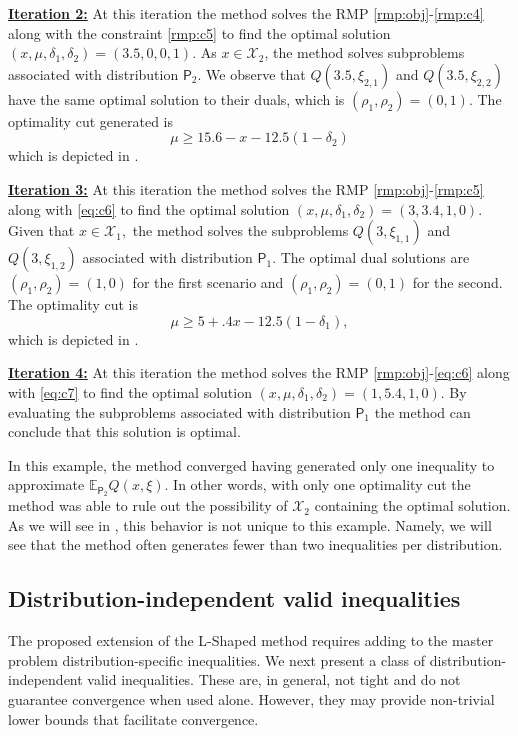 \documentclass[12pt]{article}
\theoremstyle{thmstylethree}%
\newcommand{\mtc}[1] {\mathcal{#1}}
\newcommand{\pr}[1]{\ensuremath{\mathsf{#1}}}
\def\Ex{\ensuremath{\mathbb{E}}}
\begin{document}
\noindent
\textbf{\underline{Iteration 2:}}
At this iteration the method solves the RMP \eqref{rmp:obj}-\eqref{rmp:c4} along with the constraint \eqref{rmp:c5} to find the optimal solution $(x,\mu,\delta_1,\delta_2)=(3.5,0,0,1)$. As $x \in \mtc{X}_2$, the method solves subproblems associated with distribution $\pr{P}_2.$ We observe that $Q(3.5,\xi_{2,1})$ and $Q(3.5,\xi_{2,2})$ have the same optimal solution to their duals, which is $(\rho_1,\rho_2)=(0,1).$ The optimality cut generated is
\begin{equation}\label{eq:c6}
    \mu \geq 15.6 - x - 12.5(1-\delta_2)
\end{equation}
which is depicted in .

\noindent
\textbf{\underline{Iteration 3:}}
At this iteration the method solves the RMP \eqref{rmp:obj}-\eqref{rmp:c5} along with \eqref{eq:c6} to find the optimal solution  $(x,\mu,\delta_1,\delta_2)=(3,3.4,1,0)$. Given that $x \in \mtc{X}_1,$ the method solves the subproblems $Q(3,\xi_{1,1})$ and $Q(3,\xi_{1,2})$ associated with distribution $\pr{P}_1.$ The optimal dual solutions are $(\rho_1,\rho_2)=(1,0)$ for the first scenario and $(\rho_1,\rho_2)=(0,1)$ for the second. The optimality cut is
\begin{equation}
\mu \geq 5 + .4x - 12.5(1-\delta_1), \label{eq:c7}
\end{equation}
 which is depicted in .

\noindent
\textbf{\underline{Iteration 4:}}
At this iteration the method solves the RMP \eqref{rmp:obj}-\eqref{eq:c6} along with \eqref{eq:c7} to find the optimal solution  $(x,\mu,\delta_1,\delta_2)=(1,5.4,1,0)$. By evaluating the subproblems associated with distribution $\pr{P}_1$ the method can conclude that this solution is optimal. 


In this example, the method converged having generated only one inequality to approximate $\Ex_{\pr{P}_2}Q(x,\xi)$. In other words, with only one optimality cut the method was able to rule out the possibility of $\mtc{X}_2$ containing the optimal solution. As we will see in , this behavior is not unique to this example. Namely, we will see that the method often generates fewer than two inequalities per distribution. 




\subsection{Distribution-independent valid inequalities}
\label{subsec:dist_ind_opt}
The proposed extension of the L-Shaped method requires adding to the master problem distribution-specific inequalities.
We next present a class of distribution-independent valid inequalities. These are, in general, not tight and do not guarantee convergence when used alone.
However, they may provide non-trivial lower bounds that facilitate convergence.
\end{document}
